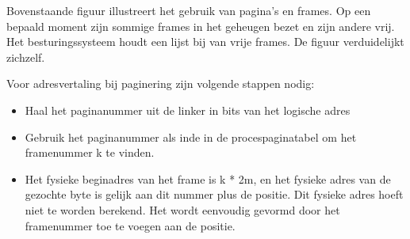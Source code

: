 Bovenstaande figuur illustreert het gebruik van pagina’s en frames. Op een bepaald moment zijn sommige frames in het geheugen bezet en zijn andere vrij. Het besturingssysteem houdt een lijst bij van vrije frames. De figuur verduidelijkt zichzelf.

Voor adresvertaling bij paginering zijn volgende stappen nodig:

\begin{itemize}
\item Haal het paginanummer uit de linker in bits van het logische adres
\item Gebruik het paginanummer als inde in de procespaginatabel om het framenummer k te vinden.
\item Het fysieke beginadres van het frame is k * 2m, en het fysieke adres van de gezochte byte is gelijk aan dit nummer plus de positie. Dit fysieke adres hoeft niet te worden berekend. Het wordt eenvoudig gevormd door het framenummer toe te voegen aan de positie.
\end{itemize}

